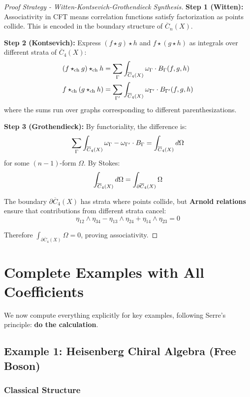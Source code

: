 \begin{proof}[Proof Strategy - Witten-Kontsevich-Grothendieck Synthesis]
\textbf{Step 1 (Witten):} Associativity in CFT means correlation functions satisfy factorization as points collide. This is encoded in the boundary structure of $\overline{C}_n(X)$.

\textbf{Step 2 (Kontsevich):} Express $(f \star g) \star h$ and $f \star (g \star h)$ as integrals over different strata of $\overline{C}_4(X)$:
\begin{align}
(f \star_{\text{ch}} g) \star_{\text{ch}} h &= \sum_\Gamma \int_{\overline{C}_{4}(X)} \omega_\Gamma \cdot B_\Gamma(f,g,h) \\
f \star_{\text{ch}} (g \star_{\text{ch}} h) &= \sum_{\Gamma'} \int_{\overline{C}_{4}(X)} \omega_{\Gamma'} \cdot B_{\Gamma'}(f,g,h)
\end{align}
where the sums run over graphs corresponding to different parenthesizations.

\textbf{Step 3 (Grothendieck):} By functoriality, the difference is:
$$\sum_\Gamma \int_{\overline{C}_{4}(X)} \omega_\Gamma - \omega_{\Gamma'} \cdot B_\Gamma = \int_{\overline{C}_{4}(X)} d\Omega$$
for some $(n-1)$-form $\Omega$. By Stokes:
$$\int_{\overline{C}_{4}(X)} d\Omega = \int_{\partial \overline{C}_4(X)} \Omega$$

The boundary $\partial \overline{C}_4(X)$ has strata where points collide, but \textbf{Arnold relations} ensure that contributions from different strata cancel:
$$\eta_{12} \wedge \eta_{34} - \eta_{13} \wedge \eta_{24} + \eta_{14} \wedge \eta_{23} = 0$$

Therefore $\int_{\partial \overline{C}_4(X)} \Omega = 0$, proving associativity.
\end{proof}

\section{Complete Examples with All Coefficients}
\label{sec:examples-complete}

We now compute everything explicitly for key examples, following Serre's principle: \textbf{do the calculation}.

\subsection{Example 1: Heisenberg Chiral Algebra (Free Boson)}
\label{subsec:heisenberg-complete}

\subsubsection{Classical Structure}

